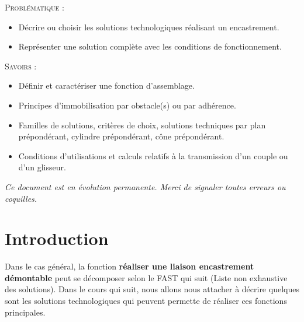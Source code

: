 \documentclass[11pt,oneside]{article}
\begin{document}
\begin{prob}
\textsc{Problématique :}
\begin{itemize}
\item Décrire ou choisir les solutions technologiques réalisant un encastrement.
\item Représenter une solution complète avec les conditions de fonctionnement.
\end{itemize}
\end{prob}

\begin{savoir}
\textsc{Savoirs :}
\begin{itemize}
\item Définir et caractériser une fonction d'assemblage.
\item Principes d'immobilisation par obstacle(s) ou par adhérence.
\item Familles de solutions, critères de choix, solutions techniques par plan prépondérant, cylindre prépondérant, cône prépondérant.
\item Conditions d'utilisations et calculs relatifs à la transmission d'un couple ou d'un glisseur.
\end{itemize}
\end{savoir}

\newpage 

\setlength{\parskip}{0ex plus 0.2ex minus 0ex}
 \renewcommand{\contentsname}{}
 \renewcommand{\baselinestretch}{1}

\tableofcontents

 \renewcommand{\baselinestretch}{1.2}
\setlength{\parskip}{2ex plus 0.5ex minus 0.2ex}

\textit{Ce document est en évolution permanente. Merci de signaler toutes
erreurs ou coquilles.}

\newpage

\section*{Introduction}

Dans le cas général, la fonction \textbf{réaliser une liaison encastrement démontable} peut se décomposer selon le FAST qui suit (Liste non exhaustive des solutions). 
Dans le cours qui suit, nous allons nous attacher à décrire quelques sont les solutions technologiques qui peuvent permette de réaliser ces fonctions principales.
\end{document}
